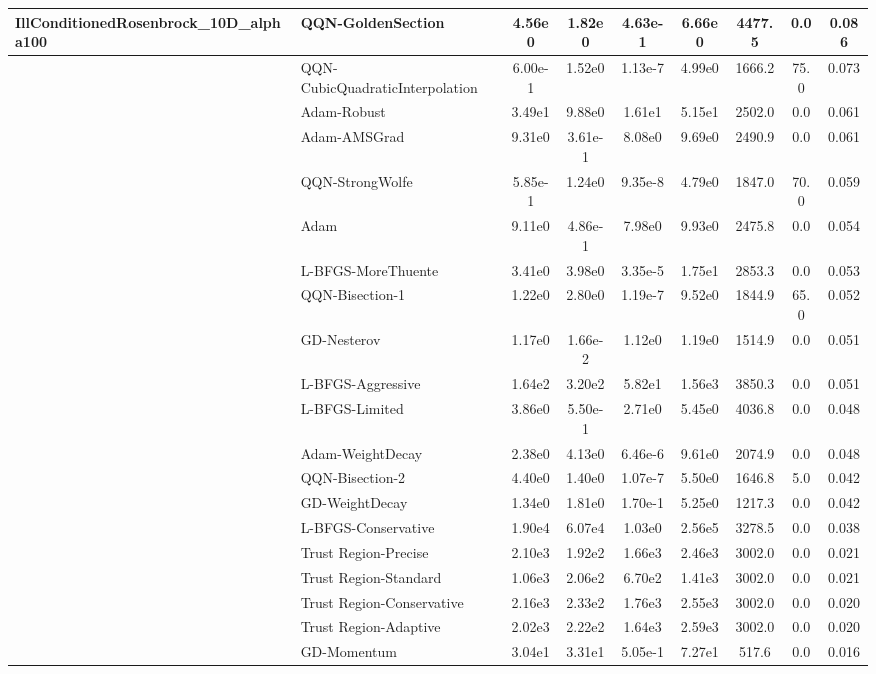 \documentclass{article}
\begin{document}
\begin{longtable}{|l|l|c|c|c|c|c|c|c|}
IllConditionedRosenbrock\_10D\_alpha100 & \textbf{QQN-GoldenSection} & 4.56e0 & 1.82e0 & 4.63e-1 & 6.66e0 & 4477.5 & 0.0 & 0.086 \\
\hline
 & QQN-CubicQuadraticInterpolation & 6.00e-1 & 1.52e0 & 1.13e-7 & 4.99e0 & 1666.2 & 75.0 & 0.073 \\
\hline
 & Adam-Robust & 3.49e1 & 9.88e0 & 1.61e1 & 5.15e1 & 2502.0 & 0.0 & 0.061 \\
\hline
 & Adam-AMSGrad & 9.31e0 & 3.61e-1 & 8.08e0 & 9.69e0 & 2490.9 & 0.0 & 0.061 \\
\hline
 & QQN-StrongWolfe & 5.85e-1 & 1.24e0 & 9.35e-8 & 4.79e0 & 1847.0 & 70.0 & 0.059 \\
\hline
 & Adam & 9.11e0 & 4.86e-1 & 7.98e0 & 9.93e0 & 2475.8 & 0.0 & 0.054 \\
\hline
 & L-BFGS-MoreThuente & 3.41e0 & 3.98e0 & 3.35e-5 & 1.75e1 & 2853.3 & 0.0 & 0.053 \\
\hline
 & QQN-Bisection-1 & 1.22e0 & 2.80e0 & 1.19e-7 & 9.52e0 & 1844.9 & 65.0 & 0.052 \\
\hline
 & GD-Nesterov & 1.17e0 & 1.66e-2 & 1.12e0 & 1.19e0 & 1514.9 & 0.0 & 0.051 \\
\hline
 & L-BFGS-Aggressive & 1.64e2 & 3.20e2 & 5.82e1 & 1.56e3 & 3850.3 & 0.0 & 0.051 \\
\hline
 & L-BFGS-Limited & 3.86e0 & 5.50e-1 & 2.71e0 & 5.45e0 & 4036.8 & 0.0 & 0.048 \\
\hline
 & Adam-WeightDecay & 2.38e0 & 4.13e0 & 6.46e-6 & 9.61e0 & 2074.9 & 0.0 & 0.048 \\
\hline
 & QQN-Bisection-2 & 4.40e0 & 1.40e0 & 1.07e-7 & 5.50e0 & 1646.8 & 5.0 & 0.042 \\
\hline
 & GD-WeightDecay & 1.34e0 & 1.81e0 & 1.70e-1 & 5.25e0 & 1217.3 & 0.0 & 0.042 \\
\hline
 & L-BFGS-Conservative & 1.90e4 & 6.07e4 & 1.03e0 & 2.56e5 & 3278.5 & 0.0 & 0.038 \\
\hline
 & Trust Region-Precise & 2.10e3 & 1.92e2 & 1.66e3 & 2.46e3 & 3002.0 & 0.0 & 0.021 \\
\hline
 & Trust Region-Standard & 1.06e3 & 2.06e2 & 6.70e2 & 1.41e3 & 3002.0 & 0.0 & 0.021 \\
\hline
 & Trust Region-Conservative & 2.16e3 & 2.33e2 & 1.76e3 & 2.55e3 & 3002.0 & 0.0 & 0.020 \\
\hline
 & Trust Region-Adaptive & 2.02e3 & 2.22e2 & 1.64e3 & 2.59e3 & 3002.0 & 0.0 & 0.020 \\
\hline
 & GD-Momentum & 3.04e1 & 3.31e1 & 5.05e-1 & 7.27e1 & 517.6 & 0.0 & 0.016 \\

\end{longtable}
\end{document}
